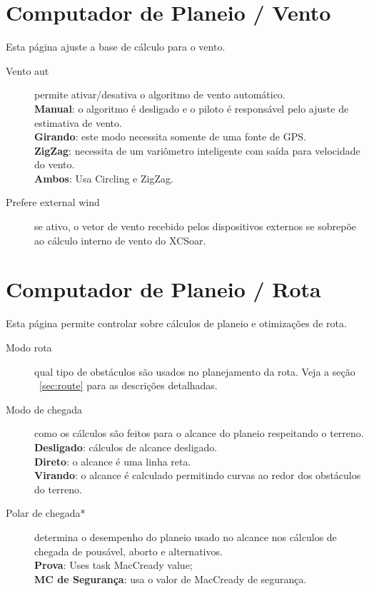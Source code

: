 \section{Computador de Planeio / Vento} \label{sec:wind}

Esta página ajuste a base de cálculo para o vento.

\begin{description}
\item[Vento aut]  \label{conf:autowind} permite ativar/desativa o algoritmo de vento automático. \\
  {\bf Manual}: o algoritmo é desligado e o piloto é responsável pelo ajuste de estimativa de vento. \\
  {\bf Girando}: este modo necessita somente de uma fonte de GPS. \\
  {\bf ZigZag}: necessita de um variômetro inteligente com saída para velocidade do vento. \\
  {\bf Ambos}:  Usa  Circling e ZigZag.
\item[Prefere external wind]  se ativo, o vetor de vento recebido pelos dispositivos externos se sobrepõe ao cálculo interno de vento do XCSoar.
\end{description}


\section{Computador de Planeio / Rota}

Esta página permite controlar sobre cálculos de planeio e otimizações de rota.

\begin{description}
\item[Modo rota]  \label{conf:routemode} qual tipo de obstáculos são usados no planejamento da rota.  Veja a seção ~\ref{sec:route} 
para as descrições detalhadas.
\item[Modo de chegada]  \label{conf:turningreach} como os cálculos são feitos para o alcance do planeio respeitando o terreno. \\
  {\bf Desligado}: cálculos de alcance desligado. \\
  {\bf Direto}: o alcance é uma linha reta. \\
  {\bf Virando}: o alcance é calculado permitindo curvas ao redor dos obstáculos do terreno.
\item[Polar de chegada*]  \label{conf:reachpolar} determina o desempenho do planeio usado no alcance nos cálculos de chegada de pousável, aborto e alternativos. \\
  {\bf Prova}: Uses task MacCready value; \\
  {\bf MC de Segurança}: usa o valor de MacCready de segurança.
\end{description}

